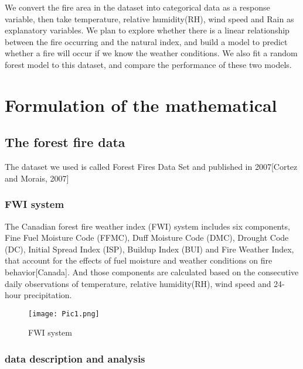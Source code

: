 \documentclass[12pt]{article}
\theoremstyle{plain}
\begin{document}
\begin{spacing}{1}
\begin{flushleft}
We convert the fire area in the dataset into categorical data as a response variable, then take temperature, relative humidity(RH), wind speed and Rain as explanatory variables. We plan to explore whether there is a linear relationship between the fire occurring and the natural index, and build a model to predict whether a fire will occur if we know the weather conditions. We also fit a random forest model to this dataset, and compare the performance of these two models.
 
  \newpage
  
 \section{Formulation of the mathematical}
 
 
 \vspace{2.0mm}
 
 
 \subsection{The forest fire data}
 
 The dataset we used is called Forest Fires Data Set and published in 2007[Cortez and Morais, 2007]
 
 
 \vspace{2.0mm}
 
 \subsubsection{FWI system}
 
 The Canadian forest fire weather index (FWI) system includes six components, Fine Fuel Moisture Code (FFMC), Duff Moisture Code (DMC), Drought Code (DC), Initial Spread Index (ISP), Buildup Index (BUI) and Fire Weather Index, that account for the effects of fuel moisture and weather conditions on fire behavior[Canada]. And those components are calculated based on the consecutive daily observations of  temperature, relative humidity(RH), wind speed and 24-hour precipitation.
 
 \vspace{2.0mm}
 
 \begin{figure}[htp]
 	\centering  
 	\texttt{[image: Pic1.png]}
 	\caption{FWI system}
 	\label{fig:figure1label}
 \end{figure}
 \vspace{2.0mm}
 
 
 \subsubsection{data description and analysis}
 

\end{flushleft}
\end{spacing}
\end{document}
